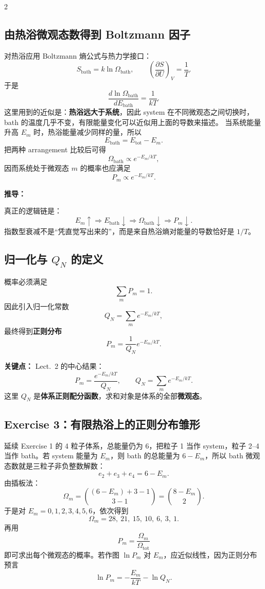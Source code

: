 \documentclass[a4paper,9pt]{article}
\newenvironment{keypoint}
{\par\vspace{0.3em}\noindent\begin{tcolorbox}[
  colback=keybg,
  colframe=keycolor,
  boxrule=0.5pt,
  arc=2pt,
  left=2pt,
  right=2pt,
  top=2pt,
  bottom=2pt,
  boxsep=0pt,
  ]
\noindent\textcolor{keycolor}{\textbf{关键点：}}}
{\end{tcolorbox}\par\vspace{0.3em}}
\newenvironment{derivation}
{\par\vspace{0.3em}\noindent\begin{tcolorbox}[
  colback=boxbg,
  colframe=derivcolor,
  boxrule=0.5pt,
  arc=2pt,
  left=2pt,
  right=2pt,
  top=2pt,
  bottom=2pt,
  boxsep=0pt,
  ]
\scriptsize\noindent\textcolor{derivcolor}{\textbf{推导：}}\par}
{\end{tcolorbox}\par\vspace{0.3em}}
\begin{document}
\begin{multicols}{2}
	\subsection{由热浴微观态数得到 Boltzmann 因子}
	对热浴应用 Boltzmann 熵公式与热力学接口：
	\[
		S_{\mathrm{bath}}=k\ln\Omega_{\mathrm{bath}},
		\qquad
		\left(\frac{\partial S}{\partial U}\right)_V=\frac1T.
	\]
	于是
	\[
		\frac{d\ln\Omega_{\mathrm{bath}}}{dE_{\mathrm{bath}}}=\frac1{kT}.
	\]
	这里用到的近似是：\textbf{热浴远大于系统}，因此 system 在不同微观态之间切换时，bath 的温度几乎不变，有限能量变化可以近似用上面的导数来描述。
	当系统能量升高 $E_m$ 时，热浴能量减少同样的量，所以
	\[
		E_{\mathrm{bath}}=E_{\mathrm{tot}}-E_m.
	\]
	把两种 arrangement 比较后可得
	\[
		\Omega_{\mathrm{bath}}\propto e^{-E_m/kT},
	\]
	因而系统处于微观态 $m$ 的概率也应满足
	\[
		P_m\propto e^{-E_m/kT}.
	\]

	\begin{derivation}
		真正的逻辑链是：
		\[
			E_m\uparrow \Rightarrow E_{\mathrm{bath}}\downarrow \Rightarrow \Omega_{\mathrm{bath}}\downarrow \Rightarrow P_m\downarrow.
		\]
		指数型衰减不是“凭直觉写出来的”，而是来自热浴熵对能量的导数恰好是 $1/T$。
	\end{derivation}

	\subsection{归一化与 $Q_N$ 的定义}
	概率必须满足
	\[
		\sum_m P_m=1.
	\]
	因此引入归一化常数
	\[
		Q_N=\sum_m e^{-E_m/kT},
	\]
	最终得到\textbf{正则分布}
	\[
		P_m=\frac{1}{Q_N}e^{-E_m/kT}.
	\]

	\begin{keypoint}
		Lect.~2 的中心结果：
		\[
			P_m=\frac{e^{-E_m/kT}}{Q_N},
			\qquad
			Q_N=\sum_m e^{-E_m/kT}.
		\]
		这里 $Q_N$ 是\textbf{体系正则配分函数}，求和对象是体系的全部\textbf{微观态}。
	\end{keypoint}

	\subsection{Exercise 3：有限热浴上的正则分布雏形}
	延续 Exercise 1 的 4 粒子体系，总能量仍为 6，把粒子 1 当作 system，粒子 2--4 当作 bath。若 system 能量为 $E_m$，则 bath 的总能量为 $6-E_m$，所以 bath 微观态数就是三粒子非负整数解数：
	\[
		e_2+e_3+e_4=6-E_m.
	\]
	由插板法：
	\[
		\Omega_m=\binom{(6-E_m)+3-1}{3-1}=\binom{8-E_m}{2}.
	\]
	于是对 $E_m=0,1,2,3,4,5,6$，依次得到
	\[
		\Omega_m=28,\ 21,\ 15,\ 10,\ 6,\ 3,\ 1.
	\]
	再用
	\[
		P_m=\frac{\Omega_m}{\Omega_{\mathrm{tot}}}
	\]
	即可求出每个微观态的概率。若作图 $\ln P_m$ 对 $E_m$，应近似线性，因为正则分布预言
	\[
		\ln P_m=-\frac{E_m}{kT}-\ln Q_N.
	\]


\end{multicols}
\end{document}
